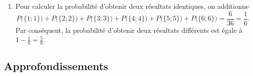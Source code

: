 {\begin{enumerate}
		Pour comprendre la probabilité de chaque événement, il est possible de différencier les deux dés (par exemple en leur assignant une couleur), et de regrouper les issues qui donnent le même résultat lorsque les dés sont identiques.
		Par exemple, « obtenir 5 puis obtenir 6 » et « obtenir 6 puis obtenir 5 » sont deux issues différentes équiprobables si les dés sont différentiables, mais pas si les dés sont identiques et les lancers simultanés.
		La situation n'est donc pas une situation d'équiprobabilité car toutes les issues n'ont pas la même probabilité d'arriver.
		Par exemple,
			\[ P\bigl( \{2 ; 2\} \bigr) = \frac1{36} \qquad \et \qquad P\bigl(\{5 ; 6\}\bigr) = \frac2{36} = \frac1{18}, \]
		car il y a deux façons d'obtenir l'issue $\{5 ; 6\}$.
		\item 
		Pour calculer la probabilité d'obtenir deux résultats identiques, on additionne 
			\[ P\bigl( \{1 ; 1\} \bigr) + P\bigl( \{2 ; 2\} \bigr)+ P\bigl( \{3 ; 3\} \bigr)+ P\bigl( \{4 ; 4\} \bigr)+ P\bigl( \{5 ; 5\} \bigr)+ P\bigl( \{6 ; 6\} \bigr) = \frac{6}{36} = \frac16. \]
		Par conséquent, la probabilité d'obtenir deux résultats différents est égale à
			$1 - \frac16 = \frac56. $
	\end{enumerate}
}


\subsection*{Approfondissements}



